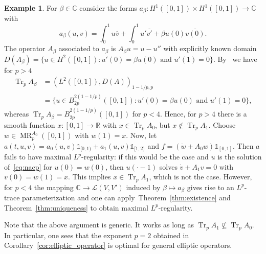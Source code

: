 \documentclass[reqno,a4paper,final]{amsart}
\numberwithin{equation}{section}
\theoremstyle{definition}
\newtheorem{example}[lemma]{Example}
\begin{document}
	\begin{example}\label{ex:robin}
		For $\beta \in {\mathbb{C}}$ consider the forms $a_{\beta}\colon H^1([0,1]) \times H^1([0,1]) \to {\mathbb{C}}$ with
    	\begin{equation*}
    		a_{\beta}(u,v) = \int_0^1 u \overline{v} + \int_{0}^1 u' \overline{v'} + \beta u(0) \overline{v(0)}.
    	\end{equation*}
    	The operator $A_{\beta}$ associated to $a_{\beta}$ is $A_{\beta}u = u - u''$ with explicitly known domain $D(A_{\beta}) = \{ u \in H^2([0,1]): u'(0) = \beta u(0) \text{ and } u'(1) = 0 \}$. By~\cite[p.~321, Theorem]{Tri78} we have for $p > 4$
    	\begin{equation*}
    		\begin{split}
    			\operatorname{Tr}_p A_{\beta} & = (L^2([0,1]),D(A))_{1-1/p,p} \\
    			& = \{ u \in B^{2(1-1/p)}_{2p}([0,1]): u'(0) = \beta u(0) \text{ and } u'(1) = 0 \},
    		\end{split} 
    	\end{equation*}
    	whereas $\operatorname{Tr}_p A_{\beta} = B_{2p}^{2(1-1/p)}([0,1])$ for $p < 4$. Hence, for $p > 4$ there is a smooth function $x\colon [0,1] \to {\mathbb{R}}$ with $x \in \operatorname{Tr}_p A_0$, but $x \not\in \operatorname{Tr}_p A_1$. Choose $w \in \operatorname{MR}_p^{A_0}([0,1])$ with $w(1) = x$. 
    	Now, let $a(t,u,v) = a_0(u,v) \mathds{1}_{[0,1)} + a_1(u,v) \mathds{1}_{[1,2)}$ and $f = (\dot{w} + A_0 w) \mathds{1}_{[0,1]}$. Then $a$ fails to have maximal $L^p$-regularity: if this would be the case and $u$ is the solution of~\eqref{eq:nacp} for $u(0) = w(0)$, then $u(\cdot - 1)$ solves $\dot{v} + A_1 v = 0$ with $v(0) = w(1) = x$. This implies $x \in \operatorname{Tr}_p A_1$, which is not the case. However, for $p < 4$ the mapping ${\mathbb{C}} \to \mathcal{L}(V,V')$ induced by $\beta \mapsto a_{\beta}$ gives rise to an $L^p$-trace parameterization and one can apply~Theorem~\ref{thm:existence} and Theorem~\ref{thm:uniqueness} to obtain maximal $L^p$-regularity. 
	\end{example}
	
	Note that the above argument is generic. It works as long as $\operatorname{Tr}_p A_1 \not\subseteq \operatorname{Tr}_p A_0$. In particular, one sees that the exponent $p = 2$ obtained in Corollary~\ref{cor:elliptic_operator} is optimal for general elliptic operators.
	
\end{document}
